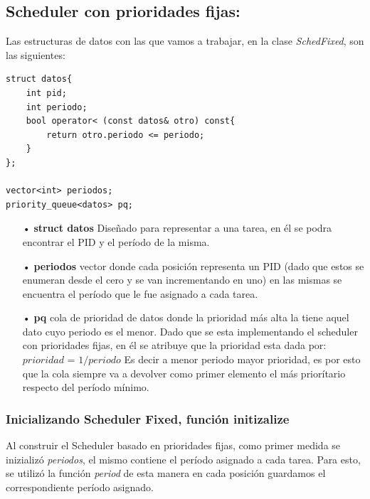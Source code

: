 \documentclass[a4paper]{article}
\begin{document}
\subsection*{Scheduler con prioridades fijas:}

Las estructuras de datos con las que vamos a trabajar, en la clase \emph{SchedFixed}, son las siguientes:
	\begin{codesnippet}
	\begin{verbatim}
struct datos{
    int pid;
    int periodo;
    bool operator< (const datos& otro) const{
        return otro.periodo <= periodo;
    }
};
		
vector<int> periodos;
priority_queue<datos> pq;
	\end{verbatim}
	\end{codesnippet}
	
	\begin{itemize}
	\item[•]\textbf{struct datos} Diseñado para representar a una tarea, en él se podra encontrar el PID y el período de la misma.
	\item[•]\textbf{periodos} vector donde cada posición representa un PID (dado que estos se enumeran desde el cero y se van incrementando en uno) en las mismas se encuentra el período que le fue asignado a cada tarea.
	\item[•]\textbf{pq} cola de prioridad de datos donde la prioridad más alta la tiene aquel dato cuyo periodo es el menor. Dado que se esta implementando el scheduler con prioridades fijas, en él se atribuye que la prioridad esta dada por:\newline
	$prioridad$ = $1 / periodo$ \newline 
	Es decir a menor periodo mayor prioridad, es por esto que la cola siempre va a devolver como primer elemento el más priorítario respecto del per\'iodo m\'inimo.
	\end{itemize}	
	
		
\subsubsection*{Inicializando Scheduler Fixed, función initizalize}		

Al construir el Scheduler basado en prioridades fijas, como primer medida se inizializó \emph{periodos}, el mismo contiene el per\'iodo asignado a cada tarea. Para esto, se utilizó la función \emph{period} de esta manera en cada posición guardamos el correspondiente per\'iodo asignado.
\end{document}
